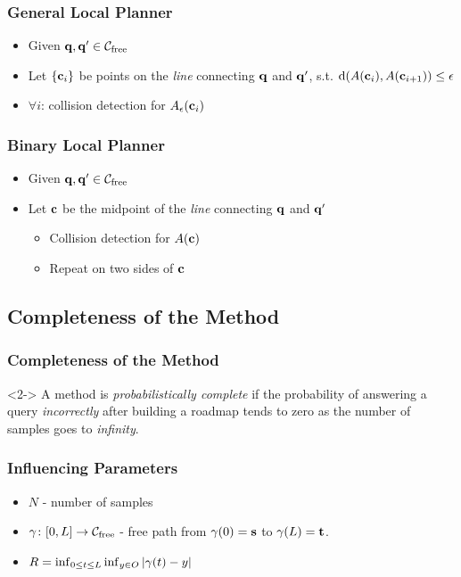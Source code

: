 \documentclass{beamer}
\begin{document}
\begin{frame}
  \frametitle{General Local Planner }
  \begin{block}{}
    \begin{itemize}
    \item Given \(\cp{q},\cp{q}' \in \cfree\)
    \item Let \(\{\cp{c}_i\}\) be points on the \emph{line} connecting \(\cp{q}\) and \(\cp{q}'\), s.t. \(\mathrm{d}(\robot(\cp{c}_i),\robot(\cp{c}_{i+1})) \leq \epsilon\)
    \item \(\forall i\): collision detection for \(\robot_\epsilon(\cp{c}_i)\)
    \end{itemize}
  \end{block}
\end{frame}

\begin{frame}
  \frametitle{Binary Local Planner }
  \begin{block}{}
    \begin{itemize}
    \item Given \(\cp{q},\cp{q}' \in \cfree\)
    \item Let \(\cp{c}\) be the midpoint of the \emph{line} connecting \(\cp{q}\) and \(\cp{q}'\)
      \begin{itemize}
      \item Collision detection for \(\robot(\cp{c})\)
      \item Repeat on two sides of \(\cp{c}\)
      \end{itemize}
    \end{itemize}
  \end{block}
\end{frame}

\subsection*{Completeness of the Method}

\begin{frame}
  \frametitle{Completeness of the Method}
  \begin{definition}<2->
    A method is \emph{probabilistically complete} if the probability of answering a query \emph{incorrectly} after building a roadmap tends to zero as the number of samples goes to \emph{infinity}.
  \end{definition}
\end{frame}

\begin{frame}
  \frametitle{Influencing Parameters}
  \begin{itemize}
  \item \(N\) - number of samples
  \item \(\gamma \colon [0,L] \to \mathcal{C}_{\text{free}}\) - free path from \(\gamma(0) = \cp{s}\) to \(\gamma(L) = \cp{t}\).
  \item \(R = \inf_{0 \leq t \leq L} \inf_{y \in O}|\gamma(t) - y|\)
  \end{itemize}

  
\end{frame}
\end{document}
